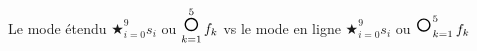 \documentclass[border=3pt]{standalone}
\begin{document}
Le mode étendu
$\displaystyle \bigstar_{i = 0}^{9} s_i$
ou
$\displaystyle \bigcompo_{k = 1}^{5} f_k$
vs le mode en ligne 
$\bigstar_{i = 0}^{9} s_i$ ou $\bigcompo_{k = 1}^{5} f_k$
\end{document}
